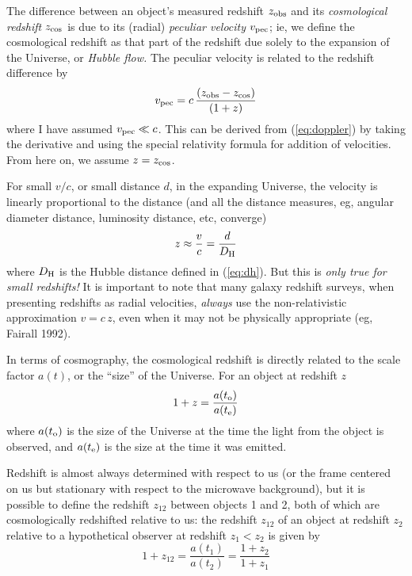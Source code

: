 The difference between an object's measured redshift $z_{\rm obs}$ and
its {\em cosmological redshift\/} $z_{\rm cos}$ is due to its (radial)
{\em peculiar velocity\/} $v_{\rm pec}$; ie, we define the
cosmological redshift as that part of the redshift due solely to the
expansion of the Universe, or {\em Hubble flow.\/} The peculiar
velocity is related to the redshift difference by
\begin{equation}
v_{\rm pec} = c\,\frac{(z_{\rm obs}-z_{\rm cos})}{(1+z)}
\end{equation}
where I have assumed $v_{\rm pec}\ll c$.  This can be derived from
(\ref{eq:doppler}) by taking the derivative and using the special
relativity formula for addition of velocities.  From here on, we
assume $z=z_{\rm cos}$.

For small $v/c$, or small distance $d$, in the expanding Universe, the
velocity is linearly proportional to the distance (and all the
distance measures, eg, angular diameter distance, luminosity distance,
etc, converge)
\begin{equation}
z \approx \frac{v}{c} = \frac{d}{D_{\rm H}}
\end{equation}
where $D_{\rm H}$ is the Hubble distance defined in (\ref{eq:dh}).
But this is {\em only true for small redshifts!\/} It is important to
note that many galaxy redshift surveys, when presenting redshifts as
radial velocities, {\em always\/} use the non-relativistic
approximation $v=c\,z$, even when it may not be physically appropriate
(eg, Fairall 1992).

In terms of cosmography, the cosmological redshift is directly related
to the scale factor $a(t)$, or the ``size'' of the Universe.  For an
object at redshift $z$
\begin{equation}
1+z = \frac{a(t_{\rm o})}{a(t_{\rm e})}
\end{equation}
where $a(t_{\rm o})$ is the size of the Universe at the time the light
from the object is observed, and $a(t_{\rm e})$ is the size at the
time it was emitted.

Redshift is almost always determined with respect to us (or the frame
centered on us but stationary with respect to the microwave
background), but it is possible to define the redshift $z_{12}$
between objects 1 and 2, both of which are cosmologically redshifted
relative to us: the redshift $z_{12}$ of an object at redshift $z_2$
relative to a hypothetical observer at redshift $z_1<z_2$ is given by
\begin{equation}
1+z_{12} = \frac{a(t_1)}{a(t_2)} = \frac{1+z_2}{1+z_1}
\end{equation}


